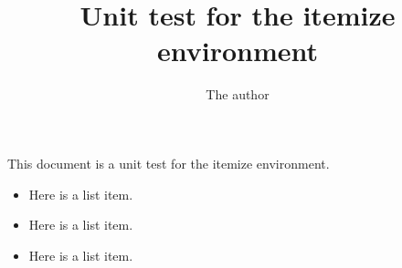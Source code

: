 \documentclass{article}
\title{Unit test for the itemize environment}
\author{The author}
\begin{document}
\maketitle

This document is a unit test for the itemize environment.

\begin{itemize}
\item Here is a list item.
\item Here is a list item.
\item Here is a list item.
\end{itemize}
\end{document}
